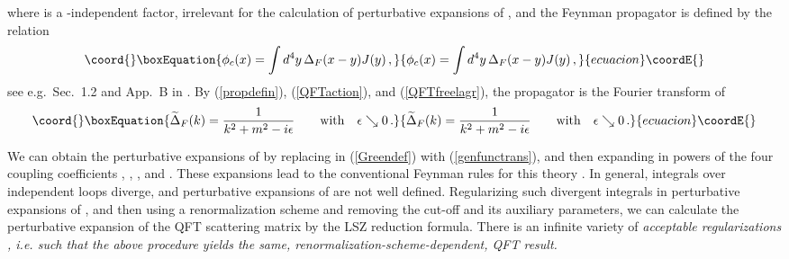 \documentclass[a4paper,12pt]{article}
\providecommand{\polje}{\phi}
\providecommand{\prop}{\widetilde{\Delta}}
\providecommand{\propF}{\prop_F}
\providecommand{\Gf}{G^{(n)}}
\providecommand{\GfZ}{\Gf_Z}
\begin{document}
where \coordHE{} is a \coordHE{}-independent factor, irrelevant for the calculation of perturbative expansions of \myHighlight{$\GfZ$}\coordHE{}, and the Feynman propagator \coordHE{} is defined by the relation
\begin{equation}\coord{}\boxEquation{
   \polje_c(x) = \int  d^4y\, \Delta_F(x-y) J(y) \,,
   \label{propdefin}
}{
   \polje_c(x) = \int  d^4y\, \Delta_F(x-y) J(y) \,,
   }{ecuacion}\coordE{}\end{equation}
see e.g.~Sec.~1.2 and App.~B in \cite{Cheng}. By (\ref{propdefin}), (\ref{QFTaction}), and (\ref{QFTfreelagr}), the propagator \coordHE{} is the Fourier transform of 
\begin{equation}\coord{}\boxEquation{
   \propF(k) = {1 \over k^2 + m^2 - i\epsilon} \qquad\hbox{with}\quad \epsilon \searrow 0 \,.
   \label{origprop}
}{
   \propF(k) = {1 \over k^2 + m^2 - i\epsilon} \qquad\hbox{with}\quad \epsilon \searrow 0 \,.
   }{ecuacion}\coordE{}\end{equation}

We can obtain the perturbative expansions of \myHighlight{$\GfZ$}\coordHE{} by replacing \coordHE{} in (\ref{Greendef}) with (\ref{genfunctrans}), and then expanding in powers of the four coupling coefficients \myHighlight{$\lambda$}\coordHE{}, \coordHE{}, \coordHE{}, and \coordHE{}. These expansions lead to the conventional Feynman rules for this theory \cite{Weinberg,Cheng}. In general, integrals over independent loops diverge, and perturbative expansions of \myHighlight{$\GfZ$}\coordHE{} are not well defined. Regularizing such divergent integrals in perturbative expansions of \myHighlight{$\GfZ$}\coordHE{}, and then using a renormalization scheme and removing the cut-off and its auxiliary parameters, we can calculate the perturbative expansion of the QFT scattering matrix by the LSZ reduction formula. There is an infinite variety of \it acceptable regularizations \rm, i.e. such that the above procedure yields the same, renormalization-scheme-dependent, QFT result.
\end{document}
